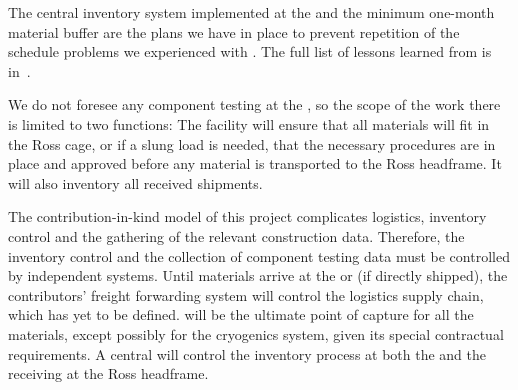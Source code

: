 The central inventory system  implemented at the   and the minimum one-month material buffer are the plans we have in place to prevent repetition of the schedule problems we experienced with .   The full list of lessons learned from  is in~\cite{bib:docdb8255}. 

We do not foresee any component testing at the , %
so the scope of the  work there is limited to two functions: %
The facility will ensure that all materials %
will fit in the Ross cage, or %
if a slung load is needed, %
that the necessary procedures are in place and approved before any material is transported to the Ross headframe. %
It will also %
inventory all received shipments. %


The contribution-in-kind model of this project complicates logistics, inventory control and the gathering of the relevant construction data. Therefore, the inventory control and the collection of component testing data must be controlled by independent systems. 
Until materials arrive at the  or  (if directly shipped), the contributors' freight forwarding system will control the logistics supply chain, which has yet to be defined.   will be the ultimate point of capture for all the materials, except possibly for the cryogenics system, given its special contractual requirements. A central  will control the inventory process at both the  and the  receiving at the Ross headframe. 

